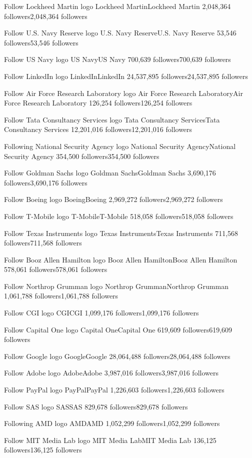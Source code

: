 Follow
Lockheed Martin logo
Lockheed MartinLockheed Martin
2,048,364 followers2,048,364 followers

Follow
U.S. Navy Reserve logo
U.S. Navy ReserveU.S. Navy Reserve
53,546 followers53,546 followers

Follow
US Navy logo
US NavyUS Navy
700,639 followers700,639 followers

Follow
LinkedIn logo
LinkedInLinkedIn
24,537,895 followers24,537,895 followers

Follow
Air Force Research Laboratory logo
Air Force Research LaboratoryAir Force Research Laboratory
126,254 followers126,254 followers

Follow
Tata Consultancy Services logo
Tata Consultancy ServicesTata Consultancy Services
12,201,016 followers12,201,016 followers

Following
National Security Agency logo
National Security AgencyNational Security Agency
354,500 followers354,500 followers

Follow
Goldman Sachs logo
Goldman SachsGoldman Sachs
3,690,176 followers3,690,176 followers

Follow
Boeing logo
BoeingBoeing
2,969,272 followers2,969,272 followers

Follow
T-Mobile logo
T-MobileT-Mobile
518,058 followers518,058 followers

Follow
Texas Instruments logo
Texas InstrumentsTexas Instruments
711,568 followers711,568 followers

Follow
Booz Allen Hamilton logo
Booz Allen HamiltonBooz Allen Hamilton
578,061 followers578,061 followers

Follow
Northrop Grumman logo
Northrop GrummanNorthrop Grumman
1,061,788 followers1,061,788 followers

Follow
CGI logo
CGICGI
1,099,176 followers1,099,176 followers

Follow
Capital One logo
Capital OneCapital One
619,609 followers619,609 followers

Follow
Google logo
GoogleGoogle
28,064,488 followers28,064,488 followers

Follow
Adobe logo
AdobeAdobe
3,987,016 followers3,987,016 followers

Follow
PayPal logo
PayPalPayPal
1,226,603 followers1,226,603 followers

Follow
SAS logo
SASSAS
829,678 followers829,678 followers

Following
AMD logo
AMDAMD
1,052,299 followers1,052,299 followers

Follow
MIT Media Lab logo
MIT Media LabMIT Media Lab
136,125 followers136,125 followers

